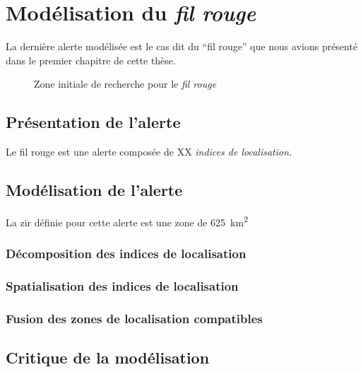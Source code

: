 \section{Modélisation du \emph{fil rouge}}
\label{sec:9-3}

La dernière alerte modélisée est le cas dit du \enquote{fil rouge} que
nous avions présenté dans le premier chapitre de cette thèse.



\begin{figure}
  \centering
  
  \caption{Zone initiale de recherche pour le \emph{fil rouge}}
  \label{fig:zir_fil_rouge}
\end{figure}

\subsection{Présentation de l'alerte}
\label{subsec:9-3-1}

Le fil rouge est une alerte composée de XX \emph{indices de
  localisation.}

\subsection{Modélisation de l'alerte}
\label{subsec:9-3-2}

La \ac{zir} définie pour cette alerte est une zone de
\SI{625}{\kilo\meter\squared}

\subsubsection{Décomposition des indices de localisation}
\label{subsec:9-3-2-1}

\subsubsection{Spatialisation des indices de localisation}
\label{subsec:9-3-2-2}

\subsubsection{Fusion des zones de localisation compatibles}
\label{subsec:9-3-2-3}

\subsection{Critique de la modélisation}
\label{subsec:9-3-3}


